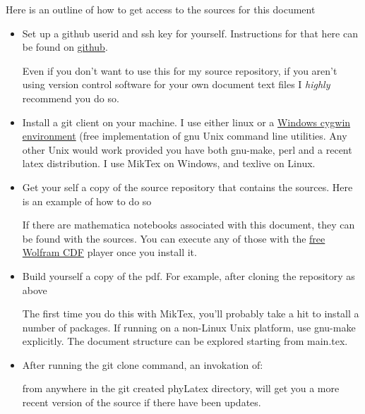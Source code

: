 Here is an outline of how to get access to the sources for this document

\begin{itemize}
\item Set up a github userid and ssh key for yourself.  Instructions for that here can be found on \href{http://help.github.com/win-set-up-git/}{github}.

Even if you don't want to use this for my source repository, if you aren't using version control software for your own document text files I \textit{highly} recommend you do so.

\item Install a git client on your machine.  I use either linux or a \href{http://www.cygwin.com/}{Windows cygwin environment} (free implementation of gnu Unix command line utilities.  Any other Unix would work provided you have both gnu-make, perl and a recent latex distribution.  I use MikTex on Windows, and texlive on Linux.

\item Get your self a copy of the source repository that contains the sources.  Here is an example of how to do so



If there are mathematica notebooks associated with this document, they can be found with the sources.  You can execute any of those with the \href{http://www.wolfram.com/cdf-player/}{free Wolfram CDF} player once you install it.

\item Build yourself a copy of the pdf.  For example, after cloning the repository as above



The first time you do this with MikTex, you'll probably take a hit to install a number of packages.  If running on a non-Linux Unix platform, use gnu-make explicitly.  The document structure can be explored starting from main.tex.

\item After running the git clone command, an invokation of:



from anywhere in the git created phyLatex directory, will get you a more recent version of the source if there have been updates.
\end{itemize}
